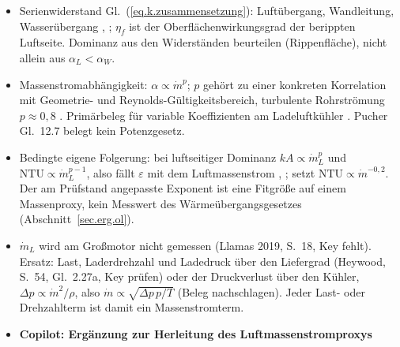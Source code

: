 \begin{itemize}
  \item Serienwiderstand Gl.~(\ref{eq.k.zusammensetzung}): Luftübergang,
    Wandleitung, Wasserübergang
    \cite[S.~256--257, Gl.~12.6]{pucherLadeluftkuehlungUndLadeluftkuehler2012},
    \cite[S.~838, Gl.~31.59]{almbauerThermomanagement2019}; $\eta_f$ ist der
    Oberflächenwirkungsgrad der berippten Luftseite. Dominanz aus den
    Widerständen beurteilen (Rippenfläche), nicht allein aus
    $\alpha_L < \alpha_W$.
  \item Massenstromabhängigkeit: $\alpha \propto \dot m^{p}$; $p$ gehört zu einer
    konkreten Korrelation mit Geometrie- und Reynolds-Gültigkeitsbereich,
    turbulente Rohrströmung $p \approx 0{,}8$
    \cite[S.~825--840]{almbauerThermomanagement2019}. Primärbeleg für variable
    Koeffizienten am Ladeluftkühler
    \cite[Abschn.~4.3, S.~8, Gl.~20--22]{vagapovDynamicModelTemperature2022}.
    Pucher Gl.~12.7 belegt kein Potenzgesetz.
  \item Bedingte eigene Folgerung: bei luftseitiger Dominanz
    $kA \propto \dot m_L^{p}$ und $\mathrm{NTU} \propto \dot m_L^{p-1}$, also
    fällt $\varepsilon$ mit dem Luftmassenstrom
    \cite[S.~206]{erikssonModelingControlEngines2014},
    \cite[Gl.~15]{theotokatosCycleMeanValue2010};
    \cite[Gl.~B.8]{suiMeanValueFirst2022} setzt
    $\mathrm{NTU} \propto \dot m^{-0{,}2}$. Der am Prüfstand angepasste Exponent
    ist eine Fitgröße auf einem Massenproxy, kein Messwert des
    Wärmeübergangsgesetzes (Abschnitt~\ref{sec.erg.ol}).
  \item $\dot m_L$ wird am Großmotor nicht gemessen (Llamas 2019, S.~18, Key
    fehlt). Ersatz: Last, Laderdrehzahl und Ladedruck über den Liefergrad
    (Heywood, S.~54, Gl.~2.27a, Key prüfen) oder der Druckverlust über den
    Kühler, $\Delta p \propto \dot m^{2}/\rho$, also
    $\dot m \propto \sqrt{\Delta p\,p/T}$ (Beleg nachschlagen). Jeder Last- oder
    Drehzahlterm ist damit ein Massenstromterm.
  \item \textbf{Copilot: Ergänzung zur Herleitung des Luftmassenstromproxys
}
\end{itemize}
